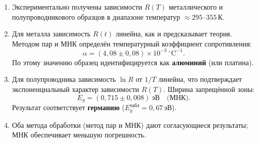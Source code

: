 \documentclass[a4paper,14pt]{article}
\begin{document}
\begin{enumerate}
    \item Экспериментально получены зависимости $R(T)$ металлического и полупроводникового образцов в диапазоне температур $\approx 295$–$355$\,К.

    \item Для металла зависимость $R(t)$ линейна, как и предсказывает теория. Методом пар и МНК определён температурный коэффициент сопротивления:
    \[
        \alpha = (4{,}08 \pm 0{,}08)\times10^{-3}\ ^{\circ}\mathrm{C}^{-1}.
    \]
    По этому значению образец идентифицируется как \textbf{алюминий} (или платина).

    \item Для полупроводника зависимость $\ln R$ от $1/T$ линейна, что подтверждает экспоненциальный характер зависимости $R(T)$. Ширина запрещённой зоны:
    \[
        E_g = (0{,}715 \pm 0{,}008)\ \text{эВ} \quad \text{(МНК)}.
    \]
    Результат соответствует \textbf{германию} ($E_g^\text{табл} = 0{,}67$\,эВ).

    \item Оба метода обработки (метод пар и МНК) дают согласующиеся результаты; МНК обеспечивает меньшую погрешность.
\end{enumerate}
\end{document}
